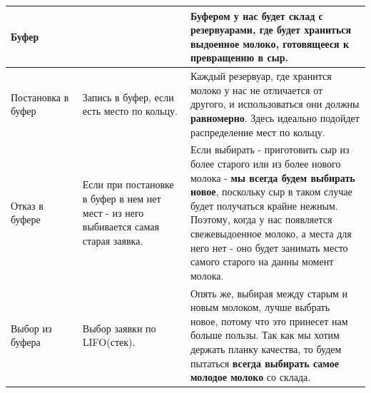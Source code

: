 \documentclass[a4paper, 14pt]{article}
\begin{document}
\begin{center}
\begin{tabular}{|p{0.2\linewidth} | p{0.3\linewidth}| p{0.5\linewidth}|}
		\hline
		Буфер              &                                                                                      & Буфером у нас будет \textbf{склад с резервуарами}, где будет храниться выдоенное молоко, готовящееся к превращению в сыр.                                                                                                                                                                                                                                                                                                                                                                                                                                                                                                                                      \\
		\hline
		Постановка в буфер & Запись в буфер, если есть место по кольцу.                                           & Каждый резервуар, где хранится молоко у нас не отличается от другого, и использоваться они должны \textbf{равномерно}. Здесь идеально подойдет распределение мест по кольцу.                                                                                                                                                                                                                                                                                                                                                                                                                                                                                   \\
		\hline
		Отказ в буфере     & Если при постановке в буфер в нем нет мест - из него выбивается самая старая заявка. & Если выбирать - приготовить сыр из более старого или из более нового молока - \textbf{мы всегда будем выбирать новое}, поскольку сыр в таком случае будет получаться крайне нежным. Поэтому, когда у нас появляется свежевыдоенное молоко, а места для него нет - оно будет занимать место самого старого на данны момент молока.                                                                                                                                                                                                                                                                                                                              \\
		\hline
		Выбор из буфера    & Выбор заявки по LIFO(стек).                                                          & Опять же, выбирая между старым и новым молоком, лучше выбрать новое, потому что это принесет нам больше пользы. Так как мы хотим держать планку качества, то будем пытаться \textbf{всегда выбирать самое молодое молоко} со склада.                                                                                                                                                                                                                                                                                                                                                                                                                           \\

\end{tabular}
\end{center}
\end{document}
